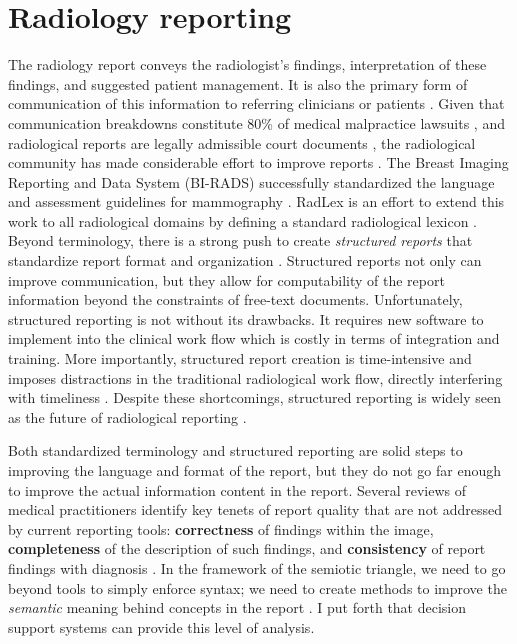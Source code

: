 \section{Radiology reporting}
The radiology report conveys the radiologist's findings, interpretation of these findings, and suggested patient management. It is also the primary form of communication of this information to referring clinicians or patients \cite{Sistrom:2005cx}. Given that communication breakdowns constitute 80\% of medical malpractice lawsuits \cite{Levinson:1994ko}, and radiological reports are legally admissible court documents \cite{Oppenheim:2012tq}, the radiological community has made considerable effort to improve reports \cite{Langlotz:2015vq}. The Breast Imaging Reporting and Data System (BI-RADS) successfully standardized the language and assessment guidelines for mammography \cite{Liberman:ws,Langlotz:2009fn,Burnside:2009ki}. RadLex is an effort to extend this work to all radiological domains by defining a standard radiological lexicon \cite{Langlotz:2006jn}. Beyond terminology, there is a strong push to create \emph{structured reports} that standardize report format and organization \cite{Langlotz:2009dd,Reiner:2009ib}. Structured reports not only can improve communication, but they allow for computability of the report information beyond the constraints of free-text documents. Unfortunately, structured reporting is not without its drawbacks. It requires new software to implement into the clinical work flow which is costly in terms of integration and training. More importantly, structured report creation is time-intensive and imposes distractions in the traditional radiological work flow, directly interfering with timeliness \cite{Weiss:2008er}. Despite these shortcomings, structured reporting is widely seen as the future of radiological reporting \cite{Langlotz:2015vq}.

Both standardized terminology and structured reporting are solid steps to improving the language and format of the report, but they do not go far enough to improve the actual information content in the report. Several reviews of medical practitioners identify key tenets of report quality that are not addressed by current reporting tools: \textbf{correctness} of findings within the image, \textbf{completeness} of the description of such findings, and \textbf{consistency} of report findings with diagnosis \cite{Johnson:2004kh, HaraldO:2004hi, Reiner:2006fa}. In the framework of the semiotic triangle, we need to go beyond tools to simply enforce syntax; we need to create methods to improve the \emph{semantic} meaning behind concepts in the report \cite{Mead:2006wm}. I put forth that decision support systems can provide this level of analysis. 


